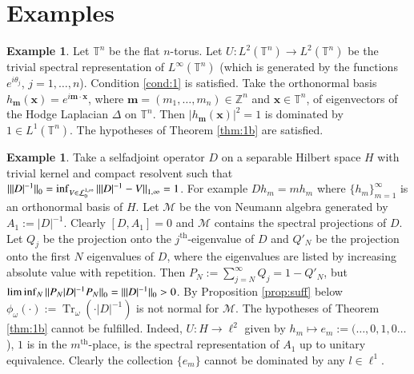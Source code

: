 \documentclass[final,1p]{elsarticle}
\numberwithin{equation}{section}
\theoremstyle{plain}
\theoremstyle{definition}
\newtheorem{ex}[thm]{Example}
\newcounter{prop2count}
\begin{document}
\section{Examples} \label{sec:ex}

\begin{ex} \label{ex:torus}
Let ${\ensuremath{\mathbb{T}}}^n$ be the flat $n$-torus.  Let $U : L^2({\ensuremath{\mathbb{T}}}^n) \to L^2({\ensuremath{\mathbb{T}}}^n)$ be the trivial spectral representation of $L^\infty({\ensuremath{\mathbb{T}}}^n)$ (which is generated by the functions $e^{i\theta_j}$, $j=1,\ldots,n$).  Condition \ref{cond:1} is satisfied. Take the orthonormal basis
$h_{\mathbf{m}}(\mathbf{x}) = e^{i \mathbf{m} \cdot \mathbf{x}}$,
where $\mathbf{m} = (m_1,\ldots,m_n) \in {\ensuremath{\mathbb{Z}}}^n$ and $\mathbf{x} \in {\ensuremath{\mathbb{T}}}^n$,
of eigenvectors of the Hodge Laplacian $\Delta$ on ${\ensuremath{\mathbb{T}}}^n$.  Then
$|h_{\mathbf{m}}(\mathbf{x})|^2 = 1$ is dominated by $1 \in L^1({\ensuremath{\mathbb{T}}}^n)$.
The hypotheses of Theorem \ref{thm:1b} are satisfied.
\end{ex}

\begin{ex} \label{ex:counter1}
Take a selfadjoint operator $D$ on a separable Hilbert space $H$ with trivial kernel and compact resolvent such that ${\mbox{\ensuremath{\| {|D|^{-1}} \|}}}_0 = \inf_{V \in \mathcal{L}^{1,\infty}_0} {\mbox{\ensuremath{\| {|D|^{-1} - V} \|}}}_{1,\infty} = 1$.  For example $Dh_m = m h_m$ where $\{ h_m \}_{m=1}^\infty$ is an orthonormal basis of $H$.  Let $\mathcal{M}$ be the von Neumann algebra generated by $A_1 := |D|^{-1}$.  Clearly $[D,A_1] = 0$ and $\mathcal{M}$ contains the spectral projections of $D$.  Let $Q_{j}$ be the projection onto the $j^\mathrm{th}$-eigenvalue of $D$ and $Q'_N$ be the projection onto the first $N$ eigenvalues of $D$, where the eigenvalues are listed by increasing absolute value with repetition.  Then $P_N := \sum_{j=N}^\infty Q_j = 1 - Q'_N$, but $\liminf_N {\mbox{\ensuremath{\| {P_N |D|^{-1} P_N} \|}}}_0 = {\mbox{\ensuremath{\| {|D|^{-1}} \|}}}_0 > 0$.  By Proposition \ref{prop:suff}
below
$\phi_\omega( \cdot) := \operatorname{Tr}_\omega( \cdot |D|^{-1})$ is not normal for $\mathcal{M}$.
The hypotheses of Theorem \ref{thm:1b} cannot be fulfilled. 
Indeed, $U : H \to \ell^2$ given by $h_m \mapsto e_m := (\ldots, 0,1,0\ldots$), $1$ is in the $m^{\mathrm{th}}$-place, is the spectral representation of $A_1$ up to unitary equivalence.  Clearly the collection $\{ e_m \}$ cannot be dominated by any $l \in \ell^1$.
\end{ex}
\end{document}
